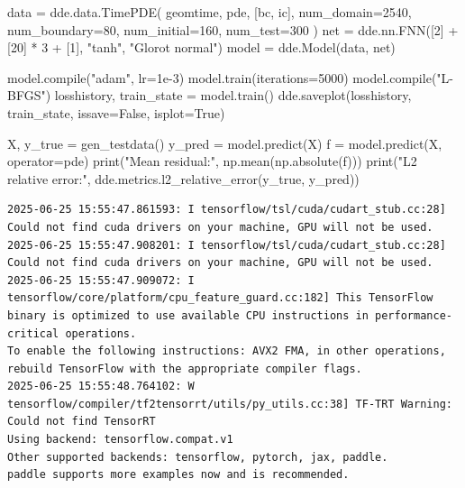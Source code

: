 \documentclass[
  spanish,
  us-letterpaper,
  DIV=11,
  numbers=noendperiod]{scrreprt}
\newenvironment{Shaded}{\begin{snugshade}}{\end{snugshade}}
\newcommand{\BuiltInTok}[1]{\textcolor[rgb]{0.00,0.23,0.31}{#1}}
\newcommand{\DecValTok}[1]{\textcolor[rgb]{0.68,0.00,0.00}{#1}}
\newcommand{\FloatTok}[1]{\textcolor[rgb]{0.68,0.00,0.00}{#1}}
\newcommand{\NormalTok}[1]{\textcolor[rgb]{0.00,0.23,0.31}{#1}}
\newcommand{\OperatorTok}[1]{\textcolor[rgb]{0.37,0.37,0.37}{#1}}
\newcommand{\StringTok}[1]{\textcolor[rgb]{0.13,0.47,0.30}{#1}}
\newcommand{\VariableTok}[1]{\textcolor[rgb]{0.07,0.07,0.07}{#1}}
\theoremstyle{definition}
\theoremstyle{plain}
\theoremstyle{remark}
\begin{document}
\begin{Shaded}
\begin{Highlighting}[]
\NormalTok{data }\OperatorTok{=}\NormalTok{ dde.data.TimePDE(}
\NormalTok{    geomtime, pde, [bc, ic],}
\NormalTok{    num\_domain}\OperatorTok{=}\DecValTok{2540}\NormalTok{,}
\NormalTok{    num\_boundary}\OperatorTok{=}\DecValTok{80}\NormalTok{,}
\NormalTok{    num\_initial}\OperatorTok{=}\DecValTok{160}\NormalTok{,}
\NormalTok{    num\_test}\OperatorTok{=}\DecValTok{300}
\NormalTok{)}
\NormalTok{net }\OperatorTok{=}\NormalTok{ dde.nn.FNN([}\DecValTok{2}\NormalTok{] }\OperatorTok{+}\NormalTok{ [}\DecValTok{20}\NormalTok{] }\OperatorTok{*} \DecValTok{3} \OperatorTok{+}\NormalTok{ [}\DecValTok{1}\NormalTok{], }\StringTok{"tanh"}\NormalTok{, }\StringTok{"Glorot normal"}\NormalTok{)}
\NormalTok{model }\OperatorTok{=}\NormalTok{ dde.Model(data, net)}

\NormalTok{model.}\BuiltInTok{compile}\NormalTok{(}\StringTok{"adam"}\NormalTok{, lr}\OperatorTok{=}\FloatTok{1e{-}3}\NormalTok{)}
\NormalTok{model.train(iterations}\OperatorTok{=}\DecValTok{5000}\NormalTok{)}
\NormalTok{model.}\BuiltInTok{compile}\NormalTok{(}\StringTok{"L{-}BFGS"}\NormalTok{)}
\NormalTok{losshistory, train\_state }\OperatorTok{=}\NormalTok{ model.train()}
\NormalTok{dde.saveplot(losshistory, train\_state, issave}\OperatorTok{=}\VariableTok{False}\NormalTok{, isplot}\OperatorTok{=}\VariableTok{True}\NormalTok{)}

\NormalTok{X, y\_true }\OperatorTok{=}\NormalTok{ gen\_testdata()}
\NormalTok{y\_pred }\OperatorTok{=}\NormalTok{ model.predict(X)}
\NormalTok{f }\OperatorTok{=}\NormalTok{ model.predict(X, operator}\OperatorTok{=}\NormalTok{pde)}
\BuiltInTok{print}\NormalTok{(}\StringTok{"Mean residual:"}\NormalTok{, np.mean(np.absolute(f)))}
\BuiltInTok{print}\NormalTok{(}\StringTok{"L2 relative error:"}\NormalTok{, dde.metrics.l2\_relative\_error(y\_true, y\_pred))}
\end{Highlighting}
\end{Shaded}

\begin{verbatim}
2025-06-25 15:55:47.861593: I tensorflow/tsl/cuda/cudart_stub.cc:28] Could not find cuda drivers on your machine, GPU will not be used.
2025-06-25 15:55:47.908201: I tensorflow/tsl/cuda/cudart_stub.cc:28] Could not find cuda drivers on your machine, GPU will not be used.
2025-06-25 15:55:47.909072: I tensorflow/core/platform/cpu_feature_guard.cc:182] This TensorFlow binary is optimized to use available CPU instructions in performance-critical operations.
To enable the following instructions: AVX2 FMA, in other operations, rebuild TensorFlow with the appropriate compiler flags.
2025-06-25 15:55:48.764102: W tensorflow/compiler/tf2tensorrt/utils/py_utils.cc:38] TF-TRT Warning: Could not find TensorRT
Using backend: tensorflow.compat.v1
Other supported backends: tensorflow, pytorch, jax, paddle.
paddle supports more examples now and is recommended.
\end{verbatim}
\end{document}
